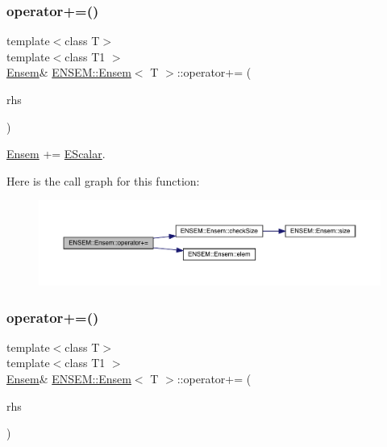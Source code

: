\subsubsection{\texorpdfstring{operator+=()}{operator+=()}\hspace{0.1cm}{\footnotesize\ttfamily [1/4]}}
{\footnotesize\ttfamily template$<$class T$>$ \\
template$<$class T1 $>$ \\
\mbox{\hyperlink{classENSEM_1_1Ensem}{Ensem}}\& \mbox{\hyperlink{classENSEM_1_1Ensem}{E\+N\+S\+E\+M\+::\+Ensem}}$<$ T $>$\+::operator+= (\begin{DoxyParamCaption}\item[{const \mbox{\hyperlink{classENSEM_1_1EScalar}{E\+Scalar}}$<$ T1 $>$ \&}]{rhs }\end{DoxyParamCaption})\hspace{0.3cm}{\ttfamily [inline]}}



\mbox{\hyperlink{classENSEM_1_1Ensem}{Ensem}} += \mbox{\hyperlink{classENSEM_1_1EScalar}{E\+Scalar}}. 

Here is the call graph for this function\+:
\nopagebreak
\begin{figure}[H]
\begin{center}
\leavevmode
\includegraphics[width=350pt]{d7/d3e/classENSEM_1_1Ensem_a3b36653814508e90b22543a3f1b465d5_cgraph}
\end{center}
\end{figure}
\mbox{\label{classENSEM_1_1Ensem_a3b36653814508e90b22543a3f1b465d5}} 
\subsubsection{\texorpdfstring{operator+=()}{operator+=()}\hspace{0.1cm}{\footnotesize\ttfamily [2/4]}}
{\footnotesize\ttfamily template$<$class T$>$ \\
template$<$class T1 $>$ \\
\mbox{\hyperlink{classENSEM_1_1Ensem}{Ensem}}\& \mbox{\hyperlink{classENSEM_1_1Ensem}{E\+N\+S\+E\+M\+::\+Ensem}}$<$ T $>$\+::operator+= (\begin{DoxyParamCaption}\item[{const \mbox{\hyperlink{classENSEM_1_1EScalar}{E\+Scalar}}$<$ T1 $>$ \&}]{rhs }\end{DoxyParamCaption})\hspace{0.3cm}{\ttfamily [inline]}}



